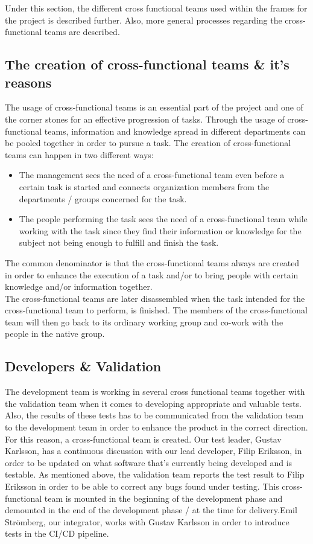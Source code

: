 Under this section, the different cross functional teams used within the frames for the project is described further. Also, more general processes regarding the cross-functional teams are described.
\subsection{The creation of cross-functional teams \& it's reasons}
The usage of cross-functional teams is an essential part of the project and one of the corner stones for an effective progression of tasks. Through the usage of cross-functional teams, information and knowledge spread in different departments can be pooled together in order to pursue a task. The creation of cross-functional teams can happen in two different ways:

\begin{itemize}
    \item The management sees the need of a cross-functional team even before a certain task is started and connects organization members from the departments / groups concerned for the task. 
    \item The people performing the task sees the need of a cross-functional team while working with the task since they find their information or knowledge for the subject not being enough to fulfill and finish the task.
\end{itemize}

The common denominator is that the cross-functional teams always are created in order to enhance the execution of a task and/or to bring people with certain knowledge and/or information together. \\

The cross-functional teams are later disassembled when the task intended for the cross-functional team to perform, is finished. The members of the cross-functional team will then go back to its ordinary working group and co-work with the people in the native group. 

\subsection{Developers \& Validation}
The development team is working in several cross functional teams together with the validation team when it comes to developing appropriate and valuable tests. Also, the results of these tests has to be communicated from the validation team to the development team in order to enhance the product in the correct direction. For this reason, a cross-functional team is created. Our test leader, Gustav Karlsson, has a continuous discussion with our lead developer, Filip Eriksson, in order to be updated on what software that's currently being developed and is testable. As mentioned above, the validation team reports the test result to Filip Eriksson in order to be able to correct any bugs found under testing. This cross-functional team is mounted in the beginning of the development phase and demounted in the end of the development phase / at the time for delivery.Emil Strömberg, our integrator, works with Gustav Karlsson in order to introduce tests in the CI/CD pipeline. 

